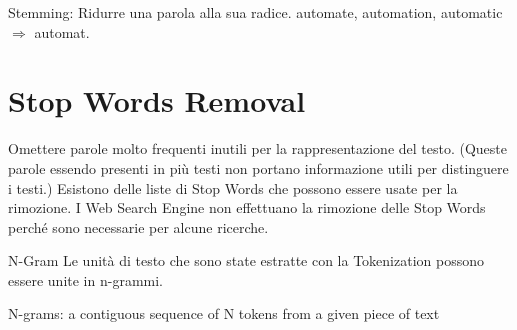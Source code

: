 Stemming: Ridurre una parola alla sua radice.
automate, automation, automatic $\Rightarrow$ automat.

\section{Stop Words Removal}
Omettere parole molto frequenti inutili per la rappresentazione del testo.
(Queste parole essendo presenti in più testi non portano informazione utili per distinguere i testi.)
Esistono delle liste di Stop Words che possono essere usate per la rimozione.
I Web Search Engine non effettuano la rimozione delle Stop Words perché sono necessarie per alcune ricerche.


N-Gram
Le unità di testo che sono state estratte con la Tokenization possono essere unite in n-grammi.

N-grams: a contiguous sequence of N tokens from a given piece of text
